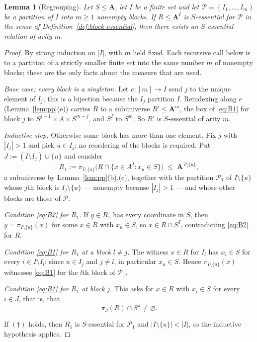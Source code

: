 \documentclass[11pt]{article}
\theoremstyle{mainplain}
\newtheorem{lemma}[theorem]{Lemma}
\theoremstyle{mainroman}
\theoremstyle{definition}
\numberwithin{equation}{section}
\newcommand{\bA}{\mathbf A}
\begin{document}
\begin{lemma}[Regrouping]\label{lem:essential-groups}
Let $S\le\bA$, let $I$ be a finite set and let $\mathcal P=(I_1,\dots,I_m)$ be a
partition of $I$ into $m\ge1$ nonempty blocks. If $R\le\bA^{I}$ is
$S$-essential for $\mathcal P$ in the sense of
Definition~\ref{def:block-essential}, then there exists an $S$-essential
relation of arity $m$.
\end{lemma}
\begin{proof}
By strong induction on $|I|$, with $m$ held fixed. Each recursive call below is
to a partition of a strictly smaller finite set into the same number $m$ of
nonempty blocks; these are the only facts about the measure that are used.

\emph{Base case: every block is a singleton.} Let $e:[m]\to I$ send $j$ to the
unique element of $I_j$; this is a bijection because the $I_j$ partition $I$.
Reindexing along $e$ (Lemma~\ref{lem:pp}(e)) carries $R$ to a subuniverse
$R'\le\bA^{m}$, the box of \eqref{eq:B1} for block $j$ to
$S^{j-1}\times A\times S^{m-j}$, and $S^{I}$ to $S^{m}$. So $R'$ is
$S$-essential of arity $m$.

\emph{Inductive step.} Otherwise some block has more than one element. Fix $j$
with $|I_j|>1$ and pick $u\in I_j$; no reordering of the blocks is required.
Put $J:=(I\setminus I_j)\cup\{u\}$ and consider
\[
 R_1:=\pi_{I\setminus\{u\}}\bigl(R\cap\{x\in A^{I}:x_u\in S\}\bigr)
 \;\le\;\bA^{\,I\setminus\{u\}},
\]
a subuniverse by Lemma~\ref{lem:pp}(b),(c), together with the partition
$\mathcal P_1$ of $I\setminus\{u\}$ whose $j$th block is $I_j\setminus\{u\}$ ---
nonempty because $|I_j|>1$ --- and whose other blocks are those of
$\mathcal P$.

\emph{Condition \eqref{eq:B2} for $R_1$.} If $y\in R_1$ has every coordinate in
$S$, then $y=\pi_{I\setminus\{u\}}(x)$ for some $x\in R$ with $x_u\in S$, so
$x\in R\cap S^{I}$, contradicting \eqref{eq:B2} for $R$.

\emph{Condition \eqref{eq:B1} for $R_1$ at a block $l\ne j$.} The witness
$x\in R$ for $I_l$ has $x_i\in S$ for every $i\in I\setminus I_l$; since
$u\in I_j$ and $j\ne l$, in particular $x_u\in S$. Hence
$\pi_{I\setminus\{u\}}(x)$ witnesses \eqref{eq:B1} for the $l$th block of
$\mathcal P_1$.

\emph{Condition \eqref{eq:B1} for $R_1$ at block $j$.} This asks for $x\in R$
with $x_i\in S$ for every $i\in J$, that is, that
\[
 \pi_{J}(R)\cap S^{J}\ne\varnothing.\tag{$\dagger$}
\]

If $(\dagger)$ holds, then $R_1$ is $S$-essential for $\mathcal P_1$ and
$|I\setminus\{u\}|<|I|$, so the inductive hypothesis applies.


\end{proof}
\end{document}
